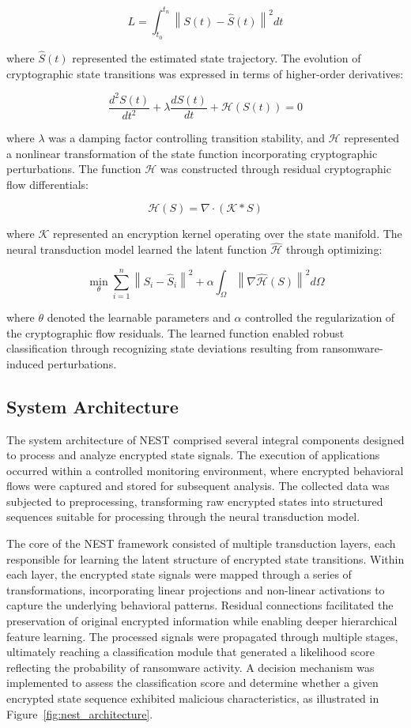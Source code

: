 \documentclass[lettersize,journal]{IEEEtran}
\begin{document}
\[
L = \int_{t_0}^{t_n} \left\| S(t) - \hat{S}(t) \right\|^2 dt
\]

where \( \hat{S}(t) \) represented the estimated state trajectory. The evolution of cryptographic state transitions was expressed in terms of higher-order derivatives:

\[
\frac{d^2 S(t)}{dt^2} + \lambda \frac{dS(t)}{dt} + \mathcal{H}(S(t)) = 0
\]

where \( \lambda \) was a damping factor controlling transition stability, and \( \mathcal{H} \) represented a nonlinear transformation of the state function incorporating cryptographic perturbations. The function \( \mathcal{H} \) was constructed through residual cryptographic flow differentials:

\[
\mathcal{H}(S) = \nabla \cdot (\mathcal{K} \ast S)
\]

where \( \mathcal{K} \) represented an encryption kernel operating over the state manifold. The neural transduction model learned the latent function \( \hat{\mathcal{H}} \) through optimizing:

\[
\min_{\theta} \sum_{i=1}^{n} \left\| S_i - \hat{S}_i \right\|^2 + \alpha \int_{\Omega} \left\| \nabla \hat{\mathcal{H}}(S) \right\|^2 d\Omega
\]

where \( \theta \) denoted the learnable parameters and \( \alpha \) controlled the regularization of the cryptographic flow residuals. The learned function enabled robust classification through recognizing state deviations resulting from ransomware-induced perturbations.


\subsection{System Architecture}

The system architecture of NEST comprised several integral components designed to process and analyze encrypted state signals. The execution of applications occurred within a controlled monitoring environment, where encrypted behavioral flows were captured and stored for subsequent analysis. The collected data was subjected to preprocessing, transforming raw encrypted states into structured sequences suitable for processing through the neural transduction model. 

The core of the NEST framework consisted of multiple transduction layers, each responsible for learning the latent structure of encrypted state transitions. Within each layer, the encrypted state signals were mapped through a series of transformations, incorporating linear projections and non-linear activations to capture the underlying behavioral patterns. Residual connections facilitated the preservation of original encrypted information while enabling deeper hierarchical feature learning. The processed signals were propagated through multiple stages, ultimately reaching a classification module that generated a likelihood score reflecting the probability of ransomware activity. A decision mechanism was implemented to assess the classification score and determine whether a given encrypted state sequence exhibited malicious characteristics, as illustrated in Figure~\ref{fig:nest_architecture}. 
\end{document}
